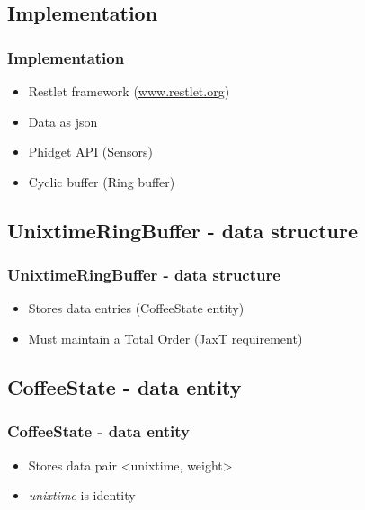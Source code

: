 \documentclass{beamer}
\begin{document}
\subsection{Implementation}
\begin{frame}
    \frametitle{Implementation}
    \begin{itemize}
        \item Restlet framework (\url{www.restlet.org})
        \item Data as json
        \item Phidget API (Sensors)
        \item Cyclic buffer (Ring buffer)
    \end{itemize}
\end{frame}

\subsection{UnixtimeRingBuffer - data structure}
\begin{frame}
    \frametitle{UnixtimeRingBuffer - data structure}
    \begin{itemize}
        \item Stores data entries (CoffeeState entity)
        \item Must maintain a Total Order (JaxT requirement)
    \end{itemize}
\end{frame}

\subsection{CoffeeState - data entity}
\begin{frame}
    \frametitle{CoffeeState - data entity}
    \begin{itemize}
        \item Stores data pair <unixtime, weight>
        \item \emph{unixtime} is identity
    \end{itemize}
\end{frame}
\end{document}

